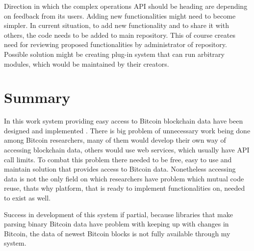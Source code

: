 \documentclass[12pt, en, eng, oneside, final]{mgr}
\begin{document}
Direction in which the complex operations API should be heading are depending on feedback from its users. Adding new functionalities might need to become simpler. In current situation, to add new functionality and to share it with others, the code needs to be added to main repository. This of course creates need for reviewing proposed functionalities by administrator of repository. Possible solution might be creating plug-in system that can run arbitrary modules, which would be maintained by their creators. 

\chapter{Summary}
In this work system providing easy access to Bitcoin blockchain data have been designed and implemented . There is big problem of unnecessary work being done among Bitcoin researchers, many of them would develop their own way of accessing blockchain data, others would use web services, which usually have API call limits. To combat this problem there needed to be free, easy to use and maintain solution that provides access to Bitcoin data. 
Nonetheless accessing data is not the only field on which researchers have problem which mutual code reuse, thats why platform, that is ready to implement functionalities on, needed to exist as well. 

Success in development of this system if partial, because libraries that make parsing binary Bitcoin data have problem with keeping up with changes in Bitcoin, the data of newest Bitcoin blocks is not fully available through my system.    
   
\end{document}
